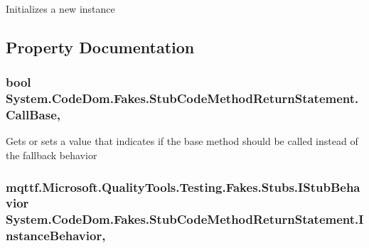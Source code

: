 Initializes a new instance



\subsection{Property Documentation}
\hypertarget{class_system_1_1_code_dom_1_1_fakes_1_1_stub_code_method_return_statement_adbd8db2e9efbd130c69a62c06cef38b4}{
\subsubsection[{Call\-Base}]{\setlength{\rightskip}{0pt plus 5cm}bool System.\-Code\-Dom.\-Fakes.\-Stub\-Code\-Method\-Return\-Statement.\-Call\-Base\hspace{0.3cm}{\ttfamily [get]}, {\ttfamily [set]}}}\label{class_system_1_1_code_dom_1_1_fakes_1_1_stub_code_method_return_statement_adbd8db2e9efbd130c69a62c06cef38b4}


Gets or sets a value that indicates if the base method should be called instead of the fallback behavior

\hypertarget{class_system_1_1_code_dom_1_1_fakes_1_1_stub_code_method_return_statement_a36fd0873db37ab071d781a259684f6c2}{
\subsubsection[{Instance\-Behavior}]{\setlength{\rightskip}{0pt plus 5cm}mqttf.\-Microsoft.\-Quality\-Tools.\-Testing.\-Fakes.\-Stubs.\-I\-Stub\-Behavior System.\-Code\-Dom.\-Fakes.\-Stub\-Code\-Method\-Return\-Statement.\-Instance\-Behavior\hspace{0.3cm}{\ttfamily [get]}, {\ttfamily [set]}}}\label{class_system_1_1_code_dom_1_1_fakes_1_1_stub_code_method_return_statement_a36fd0873db37ab071d781a259684f6c2}


